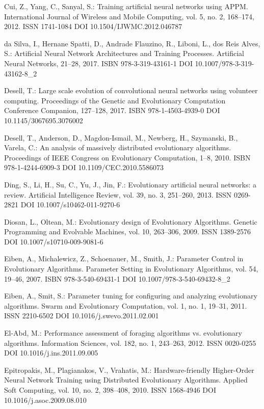 \begin{thebibliography}{99.}
 Cui, Z., Yang, C., Sanyal, S.: Training artificial neural networks using APPM. International Journal of Wireless and Mobile Computing, vol. 5, no. 2, 168--174, 2012. ISSN 1741-1084 DOI 10.1504/IJWMC.2012.046787

 da Silva, I., Hernane Spatti, D., Andrade Flauzino, R., Liboni, L., dos Reis Alves, S.: Artificial Neural Network Architectures and Training Processes. Artificial Neural Networks, 21--28, 2017. ISBN 978-3-319-43161-1 DOI 10.1007/978-3-319-43162-8\_2

 Desell, T.: Large scale evolution of convolutional neural networks using volunteer computing. Proceedings of the Genetic and Evolutionary Computation Conference Companion, 127--128, 2017. ISBN 978-1-4503-4939-0 DOI 10.1145/3067695.3076002

 Desell, T., Anderson, D., Magdon-Ismail, M., Newberg, H., Szymanski, B., Varela, C.: An analysis of massively distributed evolutionary algorithms. Proceedings of IEEE Congress on Evolutionary Computation, 1--8, 2010. ISBN 978-1-4244-6909-3 DOI 10.1109/CEC.2010.5586073

 Ding, S., Li, H., Su, C., Yu, J., Jin, F.: Evolutionary artificial neural networks: a review. Artificial Intelligence Review, vol. 39, no. 3, 251--260, 2013. ISSN 0269-2821 DOI 10.1007/s10462-011-9270-6

 Diosan, L., Oltean, M.: Evolutionary design of Evolutionary Algorithms. Genetic Programming and Evolvable Machines, vol. 10, 263--306, 2009. ISSN 1389-2576 DOI 10.1007/s10710-009-9081-6

 Eiben, A., Michalewicz, Z., Schoenauer, M., Smith, J.: Parameter Control in Evolutionary Algorithms. Parameter Setting in Evolutionary Algorithms, vol. 54, 19--46, 2007. ISBN 978-3-540-69431-1 DOI 10.1007/978-3-540-69432-8\_2

 Eiben, A., Smit, S.: Parameter tuning for configuring and analyzing evolutionary algorithms. Swarm and Evolutionary Computation, vol. 1, no. 1, 19--31, 2011. ISSN 2210-6502 DOI 10.1016/j.swevo.2011.02.001

 El-Abd, M.: Performance assessment of foraging algorithms vs. evolutionary algorithms. Information Sciences, vol. 182, no. 1, 243--263, 2012. ISSN 0020-0255 DOI 10.1016/j.ins.2011.09.005

 Epitropakis, M., Plagianakos, V., Vrahatis, M.: Hardware-friendly Higher-Order Neural Network Training using Distributed Evolutionary Algorithms. Applied Soft Computing, vol. 10, no. 2, 398--408, 2010. ISSN 1568-4946 DOI 10.1016/j.asoc.2009.08.010


\end{thebibliography}

